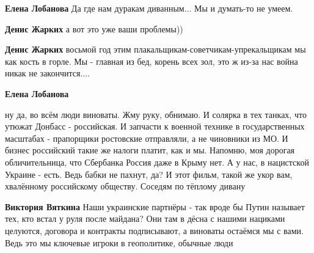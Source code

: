 \begin{itemize}
\begin{itemize}
 
\textbf{Елена Лобанова} Да где нам дуракам диванным... Мы и думать-то не умеем.

 
\textbf{Денис Жарких} а вот это уже ваши проблемы))


\textbf{Денис Жарких} восьмой год этим плакальщикам-советчикам-упрекальщикам мы
как кость в горле. Мы - главная из бед, корень всех зол, это ж из-за нас война
никак не закончится....

 
\textbf{Елена Лобанова} 

ну да, во всём люди виноваты. Жму руку, обнимаю. И солярка в тех танках, что
утюжат Донбасс - российская. И запчасти к военной технике в государственных
масштабах - прапорщики ростовские отправляли, а не чиновники из МО. И бизнес
российский такие же налоги платит, как и мы. Напомню, моя дорогая
обличительница, что Сбербанка Россия даже в Крыму нет. А у нас, в нацистской
Украине - есть. Ведь бабки не пахнут, да? И этот фильм, такой же укор вам,
хвалённому российскому обществу. Соседям по тёплому дивану

 
\textbf{Виктория Вяткина} Наши украинские партнёры - так вроде бы Путин
называет тех, кто встал у руля после майдана? Они там в дёсна с нашими нациками
целуются, договора и контракты подписывают, а виноваты остаёмся мы с вами. Ведь
это мы ключевые игроки в геополитике, обычные люди


\end{itemize}
\end{itemize}
